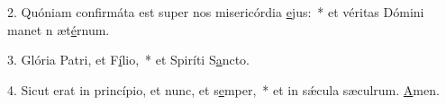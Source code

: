 2. Quóniam confirmáta est super nos misericórdia \uline{e}jus:~* et véritas Dómini manet n æt\uline{é}rnum.\par 
3. Glória Patri, et F\uline{í}lio,~* et Spiríti S\uline{a}ncto.\par 
4. Sicut erat in princípio, et nunc, et s\uline{e}mper,~* et in sǽcula sæculrum. \uline{A}men.\par 
